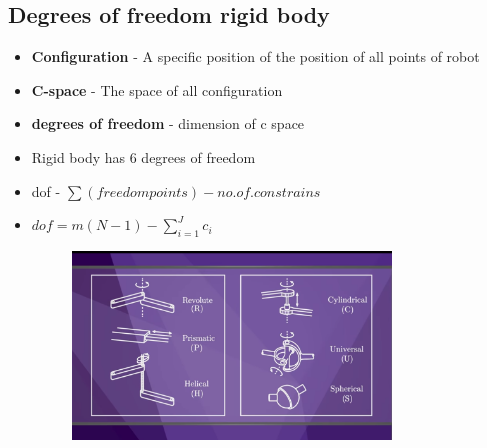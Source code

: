 \documentclass[a4paper]{article}
\begin{document}
    \subsection{Degrees of freedom rigid body}
    \begin{itemize}
        \item \textbf{Configuration} - A specific position of the position of all points of robot
        \item \textbf{C-space} - The space of all configuration
        \item \textbf{degrees of freedom} - dimension of c space 
        \item Rigid body has 6 degrees of freedom
        \item dof - $\sum (freedom points) - no.of.constrains$
        \item $dof = m(N-1) - \sum_{i=1}^J c_i$ 
            \begin{figure}[htpb]
                        \centering
                        \includegraphics[width=0.8\textwidth]{joints.png}
                        \caption{}
                        \label{fig:}
                    \end{figure}
                    
    \end{itemize}
\end{document}
